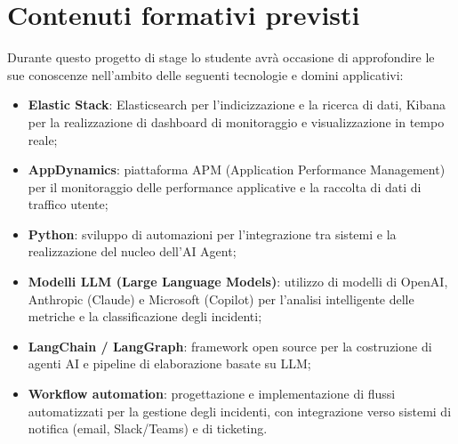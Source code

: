 \section*{Contenuti formativi previsti}
Durante questo progetto di stage lo studente avrà occasione di approfondire le sue conoscenze nell'ambito delle seguenti tecnologie e domini applicativi:
\begin{itemize}
    \item \textbf{Elastic Stack}: Elasticsearch per l'indicizzazione e la ricerca di dati, Kibana per la realizzazione di dashboard di monitoraggio e visualizzazione in tempo reale;
    \item \textbf{AppDynamics}: piattaforma APM (Application Performance Management) per il monitoraggio delle performance applicative e la raccolta di dati di traffico utente;
    \item \textbf{Python}: sviluppo di automazioni per l'integrazione tra sistemi e la realizzazione del nucleo dell'AI Agent;
    \item \textbf{Modelli LLM (Large Language Models)}: utilizzo di modelli di OpenAI, Anthropic (Claude) e Microsoft (Copilot) per l'analisi intelligente delle metriche e la classificazione degli incidenti;
    \item \textbf{LangChain / LangGraph}: framework open source per la costruzione di agenti AI e pipeline di elaborazione basate su LLM;
    \item \textbf{Workflow automation}: progettazione e implementazione di flussi automatizzati per la gestione degli incidenti, con integrazione verso sistemi di notifica (email, Slack/Teams) e di ticketing.
\end{itemize}
\newpage